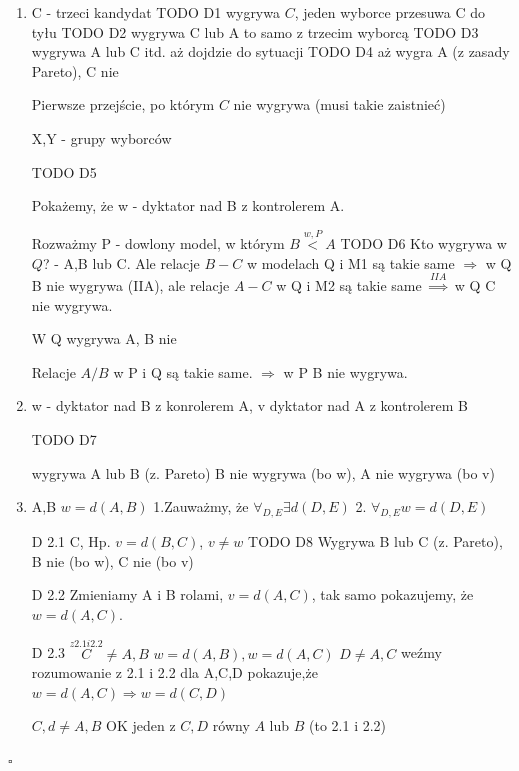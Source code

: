 \documentclass[12pt,a4paper]{article}
\theoremstyle{break}
\begin{document}
		\begin{enumerate}[Dow. I)]
			\item C - trzeci kandydat TODO D1
			wygrywa $C$, jeden wyborce przesuwa C do tyłu
			TODO D2
			wygrywa C lub A
			to samo z trzecim wyborcą
			TODO D3
			wygrywa A lub C
			itd. aż dojdzie do sytuacji
			TODO D4
			aż wygra A (z zasady Pareto), C nie
			
			Pierwsze przejście, po którym $C$ nie wygrywa (musi takie zaistnieć) 
			
			X,Y - grupy wyborców
			
			TODO D5
			
			Pokażemy, że w - dyktator nad B z kontrolerem A.
			
			Rozważmy P - dowlony model, w którym $B\overset{w,P}{<}A$ 
			TODO D6
			Kto wygrywa w $Q$? - A,B lub C. Ale relacje $B-C$ w modelach Q i M1 są takie same $\Rightarrow$ w Q B nie wygrywa (IIA), ale relacje $A-C$ w Q i M2 są takie same $\overset{IIA}{\Rightarrow}$ w Q C nie wygrywa.
			
			W Q wygrywa A, B nie
			
			Relacje $A/B$ w P i Q są takie same. $\Rightarrow$ w P B nie wygrywa.
			
			\item w - dyktator nad B z konrolerem A, v dyktator nad A z kontrolerem B
			
			TODO D7
			
			wygrywa A lub B (z. Pareto)
			B nie wygrywa (bo w), A nie wygrywa (bo v) \faBolt
			\item A,B $w = d(A,B)$
			1.Zauważmy, że $\forall_{D,E} \exists d(D,E)$ 
			2. $\forall_{D,E} w=d(D,E)$
			
			D 2.1 C, Hp. $v=d(B,C)$, $v\neq w$ TODO D8
			Wygrywa B lub C (z. Pareto), B nie (bo w), C nie (bo v)\faBolt
			
			D 2.2 Zmieniamy A i B rolami, $v= d(A,C)$, tak samo pokazujemy, że $w=d(A,C)$.
			
			D 2.3 $\overset{z 2.1 i 2.2}{C}\neq A,B$ $w=d(A,B), w=d(A,C)$ $D\neq A,C$ weźmy rozumowanie z 2.1 i 2.2 dla A,C,D pokazuje,że $w=d(A,C)\Rightarrow w=d(C,D)$ 
			
			$C,d \neq A,B$ OK
			jeden z $C,D$ równy $A$ lub $B$ (to 2.1 i 2.2)
			
		\end{enumerate}
		
		\begin{flushright}$\square$\end{flushright}
		
\end{document}
